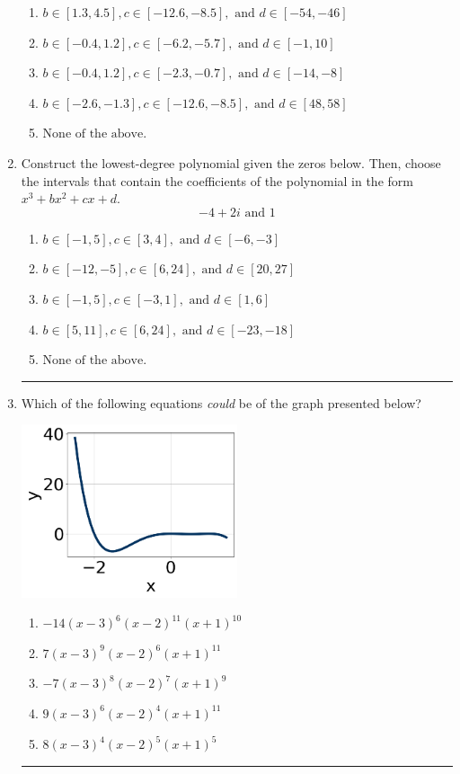 \documentclass[14pt]{extbook}
\newcommand{\litem}[1]{\item#1\hspace*{-1cm}\rule{\textwidth}{0.4pt}}
\begin{document}
\begin{enumerate}
{\begin{enumerate}[label=\Alph*.]
\item \( b \in [1.3, 4.5], c \in [-12.6, -8.5], \text{ and } d \in [-54, -46] \)
\item \( b \in [-0.4, 1.2], c \in [-6.2, -5.7], \text{ and } d \in [-1, 10] \)
\item \( b \in [-0.4, 1.2], c \in [-2.3, -0.7], \text{ and } d \in [-14, -8] \)
\item \( b \in [-2.6, -1.3], c \in [-12.6, -8.5], \text{ and } d \in [48, 58] \)
\item \( \text{None of the above.} \)

\end{enumerate} }
\litem{
Construct the lowest-degree polynomial given the zeros below. Then, choose the intervals that contain the coefficients of the polynomial in the form $x^3+bx^2+cx+d$.\[ -4 + 2 i \text{ and } 1 \]\begin{enumerate}[label=\Alph*.]
\item \( b \in [-1, 5], c \in [3, 4], \text{ and } d \in [-6, -3] \)
\item \( b \in [-12, -5], c \in [6, 24], \text{ and } d \in [20, 27] \)
\item \( b \in [-1, 5], c \in [-3, 1], \text{ and } d \in [1, 6] \)
\item \( b \in [5, 11], c \in [6, 24], \text{ and } d \in [-23, -18] \)
\item \( \text{None of the above.} \)

\end{enumerate} }
\litem{
Which of the following equations \textit{could} be of the graph presented below?
\begin{center}
    \includegraphics[width=0.5\textwidth]{../Figures/polyGraphToFunctionCopyA.png}
\end{center}
\begin{enumerate}[label=\Alph*.]
\item \( -14(x - 3)^{6} (x - 2)^{11} (x + 1)^{10} \)
\item \( 7(x - 3)^{9} (x - 2)^{6} (x + 1)^{11} \)
\item \( -7(x - 3)^{8} (x - 2)^{7} (x + 1)^{9} \)
\item \( 9(x - 3)^{6} (x - 2)^{4} (x + 1)^{11} \)
\item \( 8(x - 3)^{4} (x - 2)^{5} (x + 1)^{5} \)


\end{enumerate}}
\end{enumerate}
\end{document}

